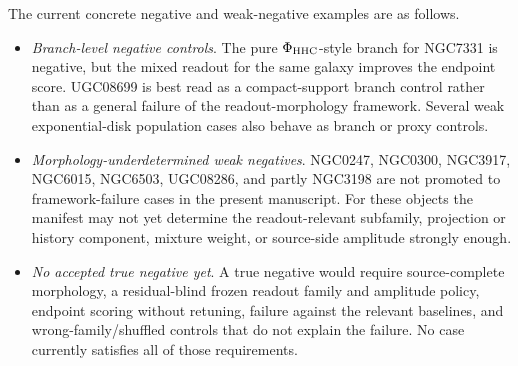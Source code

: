 \documentclass[11pt]{article}
\begin{document}
\begin{table}[H]
\centering
\caption{Predeclared future criteria for accepting a true negative against the
morphology-readout framework.}
\label{tab:true-negative-gate}
\small
{}
\end{table}

The current concrete negative and weak-negative examples are as follows.
\begin{itemize}[leftmargin=*]
\item \emph{Branch-level negative controls}.  The pure
\(\Phi_{\rm HHC}\)-style branch for NGC7331 is negative, but the mixed readout
for the same galaxy improves the endpoint score.  UGC08699 is best read as a
compact-support branch control rather than as a general failure of the
readout-morphology framework.  Several weak exponential-disk population cases
also behave as branch or proxy controls.
\item \emph{Morphology-underdetermined weak negatives}.  NGC0247, NGC0300,
NGC3917, NGC6015, NGC6503, UGC08286, and partly NGC3198 are not promoted to
framework-failure cases in the present manuscript.  For these objects the
manifest may not yet determine the readout-relevant subfamily, projection or
history component, mixture weight, or source-side amplitude strongly enough.
\item \emph{No accepted true negative yet}.  A true negative would require
source-complete morphology, a residual-blind frozen readout family and
amplitude policy, endpoint scoring without retuning, failure against the
relevant baselines, and wrong-family/shuffled controls that do not explain the
failure.  No case currently satisfies all of those requirements.
\end{itemize}
\end{document}
